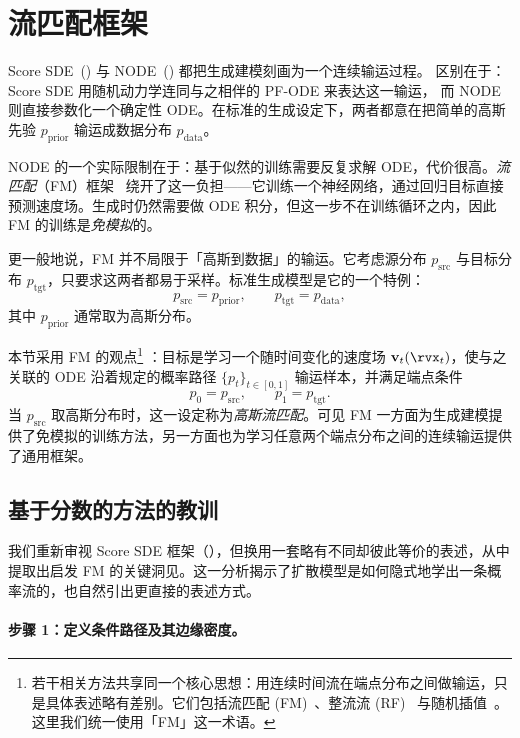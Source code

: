 \section{\texorpdfstring{流匹配框架}{流匹配框架}}\label{sec:flow-matching-framework}

Score SDE~() 与
NODE~() 都把生成建模刻画为一个连续输运过程。
区别在于：Score SDE 用随机动力学连同与之相伴的 PF-ODE 来表达这一输运，
而 NODE 则直接参数化一个确定性 ODE。在标准的生成设定下，两者都意在把简单的高斯先验
$p_{\mathrm{prior}}$ 输运成数据分布 $p_{\mathrm{data}}$。

NODE 的一个实际限制在于：基于似然的训练需要反复求解 ODE，代价很高。\emph{流匹配}（FM）框架~\citep{lipman2022flow,lipman2024flow,tongimproving} 绕开了这一负担——它训练一个神经网络，通过回归目标直接预测速度场。生成时仍然需要做 ODE 积分，但这一步不在训练循环之内，因此 FM 的训练是\emph{免模拟}的。

更一般地说，FM 并不局限于「高斯到数据」的输运。它考虑源分布 $p_{\mathrm{src}}$ 与目标分布 $p_{\mathrm{tgt}}$，只要求这两者都易于采样。标准生成模型是它的一个特例：
\[
p_{\mathrm{src}}=p_{\mathrm{prior}},
\qquad
p_{\mathrm{tgt}}=p_{\mathrm{data}},
\]
其中 $p_{\mathrm{prior}}$ 通常取为高斯分布。

本节采用 FM 的观点\footnote{若干相关方法共享同一个核心思想：用连续时间流在端点分布之间做输运，只是具体表述略有差别。它们包括流匹配 (FM)~\citep{lipman2022flow,neklyudov2023action}、整流流 (RF)~\citep{liu2022rectified,heitz2023iterative} 与随机插值~\citep{albergo2023stochastic,albergobuilding,ma2024sit}。这里我们统一使用「FM」这一术语。}
：目标是学习一个随时间变化的速度场 $\mathbf{v}_t(\rvx_t)$，使与之关联的 ODE 沿着规定的概率路径 $\{p_t\}_{t\in[0,1]}$ 输运样本，并满足端点条件
\[
p_0=p_{\mathrm{src}},
\qquad
p_1=p_{\mathrm{tgt}}.
\]
当 $p_{\mathrm{src}}$ 取高斯分布时，这一设定称为\emph{高斯流匹配}。可见 FM 一方面为生成建模提供了免模拟的训练方法，另一方面也为学习任意两个端点分布之间的连续输运提供了通用框架。


\subsection{基于分数的方法的教训}\label{subsec:lesson-score}

我们重新审视 Score SDE 框架（），但换用一套略有不同却彼此等价的表述，从中提取出启发 FM 的关键洞见。这一分析揭示了扩散模型是如何隐式地学出一条概率流的，也自然引出更直接的表述方式。


\paragraph{步骤 1：定义条件路径及其边缘密度。}

